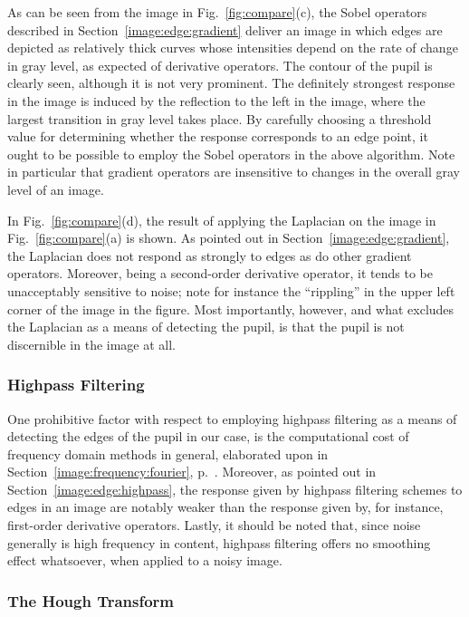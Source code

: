 As can be seen from the image in Fig.~\ref{fig:compare}(c), the Sobel
operators described in Section~\ref{image:edge:gradient} deliver an
image in which edges are depicted as relatively thick curves whose
intensities depend on the rate of change in gray level, as expected of
derivative operators.  The contour of the pupil is clearly seen,
although it is not very prominent.  The definitely strongest response
in the image is induced by the reflection to the left in the image,
where the largest transition in gray level takes place.  By carefully
choosing a threshold value for determining whether the response
corresponds to an edge point, it ought to be possible to employ the
Sobel operators in the above algorithm.  Note in particular that
gradient operators are insensitive to changes in the overall gray
level of an image.

In Fig.~\ref{fig:compare}(d), the result of applying the Laplacian on
the image in Fig.~\ref{fig:compare}(a) is shown.  As pointed out in
Section~\ref{image:edge:gradient}, the Laplacian does not respond as
strongly to edges as do other gradient operators.  Moreover, being a
second-order derivative operator, it tends to be unacceptably
sensitive to noise; note for instance the ``rippling'' in the upper
left corner of the image in the figure.  Most importantly, however,
and what excludes the Laplacian as a means of detecting the pupil, is
that the pupil is not discernible in the image at all.

\subsubsection{Highpass Filtering}

One prohibitive factor with respect to employing highpass filtering as
a means of detecting the edges of the pupil in our case, is the
computational cost of frequency domain methods in general, elaborated
upon in Section~\ref{image:frequency:fourier}, p.~\pageref{pg:fft:O}.
Moreover, as pointed out in Section~\ref{image:edge:highpass}, the
response given by highpass filtering schemes to edges in an image are
notably weaker than the response given by, for instance, first-order
derivative operators.  Lastly, it should be noted that, since noise
generally is high frequency in content, highpass filtering offers no
smoothing effect whatsoever, when applied to a noisy image.

\subsubsection{The Hough Transform}


